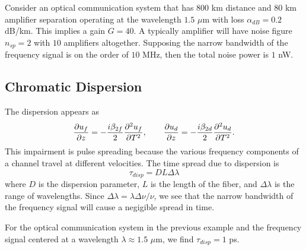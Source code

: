 Consider an optical communication system that has $800$ km distance and $80$ km amplifier separation operating at the wavelength $1.5$ $\mu$m with loss $\alpha_{dB} = 0.2$ dB/km. This implies a gain $G=40$. A typically amplifier will have noise figure $n_{sp} = 2$ with $10$ amplifiers altogether. Supposing the narrow bandwidth of the frequency signal is on the order of $10$ MHz, then the total noise power is $1$ nW.

\subsection{Chromatic Dispersion}

The dispersion appears as
%
\begin{equation*}
\frac{\partial u_f}{\partial z} = -\frac{i\beta_{2f}}{2}\frac{\partial ^2u_f}{\partial T^2}, \qquad \frac{\partial u_d}{\partial z} = -\frac{i\beta_{2d}}{2}\frac{\partial ^2u_d}{\partial T^2}.
\end{equation*}
%
This impairment is pulse spreading because the various frequency components of a channel travel at different velocities. The time spread due to dispersion is \cite{agrawal2012fiber}
%
\begin{equation}
\tau_{disp} = DL\Delta \lambda 
\end{equation}
%
where $D$ is the dispersion parameter, $L$ is the length of the fiber, and $\Delta\lambda$ is the range of wavelengths. Since $\Delta\lambda = \lambda\Delta\nu/\nu$, we see that the narrow bandwidth of the frequency signal will cause a negigible spread in time.

For the optical communication system in the previous example and the frequency signal centered at a wavelength $\lambda \approx 1.5$ $\mu$m, we find $\tau_{disp} = 1$ ps.

%
%
%
%
%


